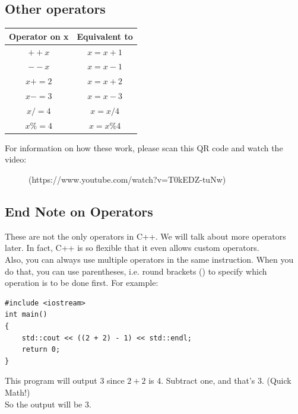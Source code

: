 \documentclass[letterpaper, 12pt]{book}
\begin{document}
\subsection{Other operators}
\begin{center}
	\begin{tabular}{ |c|c| } 
		\hline
		Operator on x & Equivalent to\\
		\hline
		$++x$ & $x = x + 1$\\
		$--x$ & $x = x - 1$\\
		$x += 2$ & $x = x + 2$\\
		$x -= 3$ & $x = x - 3$\\
		$x /= 4$ & $x = x / 4$\\
		$x \%= 4$& $x = x \% 4$\\
		\hline
	\end{tabular}
\end{center}
For information on how these work, please scan this QR code and watch the video:\\
\begin{figure}[h]
\centering
{}
\caption{(https://www.youtube.com/watch?v=T0kEDZ-tuNw)}
\end{figure}
\subsection{End Note on Operators}
These are not the only operators in C++. We will talk about more operators later. In fact, C++ is so flexible that it even allows custom operators.\\
Also, you can always use multiple operators in the same instruction. When you do that, you can use parentheses, i.e. round brackets () to specify which operation is to be done first. For example:
\begin{lstlisting}
#include <iostream>
int main()
{
	std::cout << ((2 + 2) - 1) << std::endl;
	return 0;
}
\end{lstlisting}
This program will output 3 since $2 + 2$ is $4$. Subtract one, and that's $3$. (Quick Math!)\\
So the output will be 3.
\end{document}
